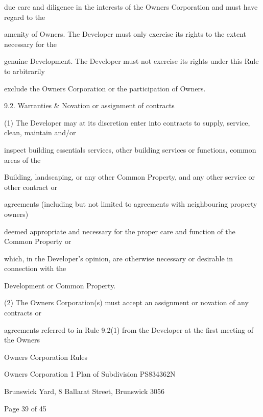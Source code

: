 \documentclass{article}
\begin{document}
{\fontsize{10.02}{1}due care and diligence in the interests of the Owners Corporation and must have regard to the }

{\fontsize{10.02}{1}amenity of Owners. The Developer must only exercise its rights to the extent necessary for the }

{\fontsize{10.02}{1}genuine Development. The Developer must not exercise its rights under this Rule to arbitrarily }

{\fontsize{10.02}{1}exclude the Owners Corporation or the participation of Owners. }

{\fontsize{9.99}{1}9.2. Warranties \& Novation or assignment of contracts }

{\fontsize{9.962}{1}(1) The Developer may at its discretion enter into contracts to supply, service, clean, maintain and/or }

{\fontsize{10.02}{1}inspect building essentials services, other building services or functions, common areas of the }

{\fontsize{10.02}{1}Building, landscaping, or any other Common Property, and any other service or other contract or }

{\fontsize{10.02}{1}agreements (including but not limited to agreements with neighbouring property owners) }

{\fontsize{10.02}{1}deemed appropriate and necessary for the proper care and function of the Common Property or }

{\fontsize{10.02}{1}which, in the Developer’s opinion, are otherwise necessary or desirable in connection with the }

{\fontsize{10.02}{1}Development or Common Property. }

{\fontsize{9.962}{1}(2) The Owners Corporation(s) must accept an assignment or novation of any contracts or }

{\fontsize{10.02}{1}agreements referred to in Rule 9.2(1) from the Developer at the first meeting of the Owners }

\newpage





{\fontsize{9}{1}Owners Corporation Rules }

{\fontsize{9}{1}Owners Corporation 1 Plan of Subdivision PS834362N }

{\fontsize{9}{1}Brunswick Yard, 8 Ballarat Street, Brunswick 3056 }


{\fontsize{9}{1}Page 39  of 45 }
\end{document}
